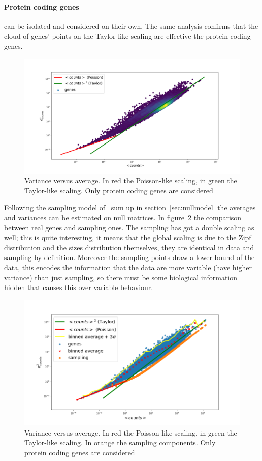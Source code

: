 \paragraph{Protein coding genes} can be isolated and considered on their own. The same analysis confirms that the cloud of genes' points on the Taylor-like scaling are effective the protein coding genes.
\begin{figure}[htb!]
    \centering
    \includegraphics[width=0.9\linewidth]{pictures/scalelaws/gtex/varmean_loglog_density.png}
    \caption{Variance versus average. In red the Poisson-like scaling, in green the Taylor-like scaling. Only protein coding genes are considered}
    \label{fig:scalelaws/gtex/varmean_loglog_density}
\end{figure}
Following the sampling model of~\cite{Mazzolini2018} sum up in section~\ref{sec:nullmodel} the averages and variances can be estimated on null matrices. In figure~\ref{fig:scalelaws/gtex/varmean_3sigma} the comparison between real genes and sampling ones. The sampling has got a double scaling as well; this is quite interesting, it means that the global scaling is due to the Zipf distribution and the sizes distribution themselves, they are identical in data and sampling by definition.
Moreover the sampling points draw a lower bound of the data, this encodes the information that the data are more variable (have higher variance) than just sampling, so there must be some biological information hidden that causes this over variable behaviour.
\begin{figure}[htb!]
    \centering
    \includegraphics[width=0.9\linewidth]{pictures/scalelaws/gtex/varmean_3sigma.png}
    \caption{Variance versus average. In \textcolor{pythonred}{red} the Poisson-like scaling, in \textcolor{pythongreen}{green} the Taylor-like scaling. In \textcolor{pythonorange}{orange} the sampling components. Only protein coding genes are considered}
    \label{fig:scalelaws/gtex/varmean_3sigma}
\end{figure}

